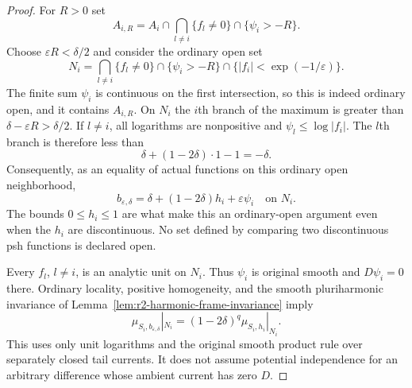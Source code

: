 \documentclass[11pt,a4paper]{article}
\numberwithin{equation}{section}
\theoremstyle{definition}
\theoremstyle{remark}
\begin{document}
\begin{proof}
For $R>0$ set
\[
 A_{i,R}=A_i\cap\bigcap_{l\ne i}\{f_l\ne0\}
                    \cap\{\psi_i>-R\}.
\]
Choose $\varepsilon R<\delta/2$ and consider the ordinary open set
\begin{equation}
 N_i=
 \bigcap_{l\ne i}\{f_l\ne0\}
       \cap\{\psi_i>-R\}
       \cap\{|f_i|<\exp(-1/\varepsilon)\}.
 \label{eq:r3-carrier-active-open}
\end{equation}
The finite sum $\psi_i$ is continuous on the first intersection,
so this is indeed ordinary open, and it contains $A_{i,R}$.
On $N_i$ the $i$th branch of the maximum is greater than
$\delta-\varepsilon R>\delta/2$.  If $l\ne i$, all logarithms
are nonpositive and $\psi_l\leq\log|f_i|$.  The $l$th branch is
therefore less than
\[
 \delta+(1-2\delta)\cdot1-1=-\delta.
\]
Consequently, as an equality of actual functions on this ordinary
open neighborhood,
\begin{equation}
 b_{\varepsilon,\delta}
      =\delta+(1-2\delta)h_i+\varepsilon\psi_i
      \quad\text{on }N_i.
 \label{eq:r3-carrier-active-branch}
\end{equation}
The bounds $0\leq h_i\leq1$ are what make this an ordinary-open
argument even when the $h_i$ are discontinuous.  No set defined by
comparing two discontinuous psh functions is declared open.

Every $f_l$, $l\ne i$, is an analytic unit on $N_i$.  Thus $\psi_i$
is original smooth and $D\psi_i=0$ there.  Ordinary locality,
positive homogeneity, and the smooth pluriharmonic invariance of
Lemma~\ref{lem:r2-harmonic-frame-invariance} imply
\begin{equation}
 \mu_{S_i,b_{\varepsilon,\delta}}|_{N_i}
       =(1-2\delta)^q\mu_{S_i,h_i}|_{N_i}.
 \label{eq:r3-carrier-local-measure}
\end{equation}
This uses only unit logarithms and the original smooth product rule
over separately closed tail currents.  It does not assume potential
independence for an arbitrary difference whose ambient current has
zero $D$.


\end{proof}
\end{document}
